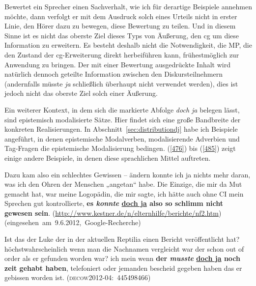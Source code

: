 Bewertet ein Sprecher einen Sachverhalt, wie ich für derartige Beispiele annehmen möchte, dann verfolgt er mit dem Ausdruck solch eines Urteils nicht in erster Linie, den Hörer dazu zu bewegen, diese Bewertung zu teilen. Und in diesem Sinne ist es nicht das oberste Ziel dieses Typs von Äußerung, den cg um diese Information zu erweitern. Es besteht deshalb nicht die Notwendigkeit, die MP, die den Zustand der cg-Erweiterung direkt herbeiführen kann, frühestmöglich zur Anwendung zu bringen. Der mit einer Bewertung  ausgedrückte Inhalt wird natürlich dennoch geteilte Information zwischen den Diskursteilnehmern (andernfalls müsste \textit{ja} schließlich überhaupt nicht verwendet werden), dies ist jedoch nicht das oberste Ziel solch einer Äußerung.

Ein weiterer Kontext, in dem sich die markierte Abfolge \textit{doch ja} belegen lässt, sind epistemisch  modalisierte Sätze. Hier findet sich eine große Bandbreite der konkreten Realisierungen. In Abschnitt~\ref{sec:distributiondj} habe ich Beispiele angeführt, in denen  epistemische Modalverben, modalisierende Adverbien  und Tag-Fragen  die epistemische Modalisierung bedingen. (\ref{476}) bis (\ref{485}) zeigt einige andere Beispiele, in denen diese sprachlichen Mittel auftreten.

\begin{exe}
	\ex\label{476} 

	Dazu kam also ein schlechtes Gewissen – ändern konnte ich ja nichts mehr daran, was ich den Ohren der Menschen „angetan“ habe. Die Einzige, 	die mir da Mut gemacht hat, war meine Logopädin, die mir sagte, ich hätte auch ohne CI mein Sprechen gut kontrollierte, \textbf{es \textit{konnte} 			\underline{doch ja} also so schlimm nicht gewesen sein}.\newline	
	{\scriptsize(\url{http://www.kestner.de/n/elternhilfe/berichte/nf2.htm})}	
	\newline		
	\hbox{}\hfill\hbox{(eingesehen am 9.6.2012, Google-Recherche)}	
	\newline		
	\hbox{}\hfill\hbox{\citet[228]{Mueller2017b}}
\end{exe} 

\begin{exe}
	\ex\label{477} 

	Ist das der Luke der in der aktuellen Reptilia einen Bericht veröffentlicht hat? höchstwahrscheinlich wenn man die Nachnamen vergleicht war der schon 		out of order als er gefunden worden war? ich mein wenn \textbf{der \textit{musste} \underline{doch ja} noch zeit gehabt haben}, telefoniert oder 			jemanden bescheid gegeben haben das er gebissen worden ist. 	
	\hfill\hbox{\scshape(decow2012-04: 445498466)}	
\end{exe}\pagebreak

